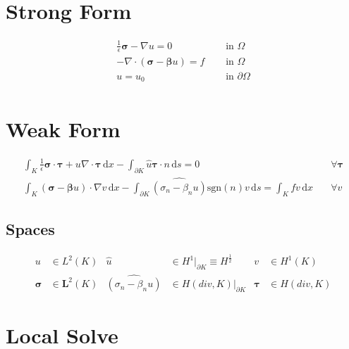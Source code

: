 \documentclass[a4paper]{article}
\def\d{\,\mathrm{d}}
\def\dx{\d x}
\def\ds{\d s}
\def\btau{\boldsymbol\tau}
\def\bsigma{\boldsymbol\sigma}
\def\bbeta{\boldsymbol\beta}
\begin{document}
\section*{Strong Form}
\begin{align*}
\frac{1}{\epsilon}\bsigma-\nabla u=0 & \quad\text{ in }\Omega\\
-\nabla\cdot(\bsigma-\bbeta u)=f & \quad\text{ in }\Omega\\
u=u_0 & \quad\text{ in }\partial\Omega\\
\end{align*}
\section*{Weak Form}
\begin{align*}
\int_K\frac{1}{\epsilon}\bsigma\cdot\btau+u\nabla\cdot\btau\dx
-\int_{\partial K}\hat u\btau\cdot n\ds=0 & \quad\forall\btau\\
\int_K(\bsigma-\bbeta u)\cdot\nabla v\dx
- \int_{\partial K}\widehat{(\sigma_n-\beta_nu)}\text{sgn}(n)v\ds
=\int_Kfv\dx & \quad\forall v
\end{align*}
\subsection*{Spaces}
\begin{align*}
u&\in L^2(K) & \hat u&\in H^1|_{\partial K}\equiv H^{\frac{1}{2}} 
& v&\in H^1(K)\\
\bsigma&\in\mathbf{L}^2(K) & \widehat{(\sigma_n-\beta_nu)}&\in H(div,K)|_{\partial K} 
& \btau&\in H(div,K)
\end{align*}
\section*{Local Solve}
\end{document}
